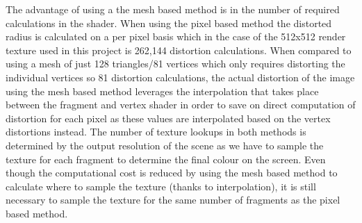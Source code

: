 \documentclass[]{article}
\begin{document}
The advantage of using a the mesh based method is in the number of required calculations in the shader. When using the pixel based method the distorted radius is calculated on a per pixel basis which in the case of the 512x512 render texture used in this project is 262,144 distortion calculations. When compared to using a mesh of just 128 triangles/81 vertices which only requires distorting the individual vertices so 81 distortion calculations, the actual distortion of the image using the mesh based method leverages the interpolation that takes place between the fragment and vertex shader in order to save on direct computation of distortion for each pixel as these values are interpolated based on the vertex distortions instead. The number of texture lookups in both methods is determined by the output resolution of the scene as we have to sample the texture for each fragment to determine the final colour on the screen. Even though the computational cost is reduced by using the mesh based method to calculate where to sample the texture (thanks to interpolation), it is still necessary to sample the texture for the same number of fragments as the pixel based method.
\end{document}
